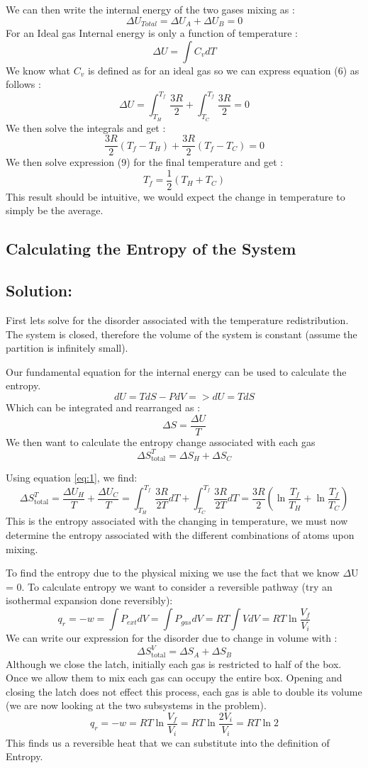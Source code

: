 \documentclass{article}
\newcommand{\be}{\begin{equation}}
\newcommand{\ee}{\end{equation}}
\begin{document}
We can then write the internal energy of the two gases mixing as : 
\be
\Delta U_{Total}=\Delta U_{A} + \Delta U_{B} = 0 
\ee
For an Ideal gas Internal energy is only a function of temperature : 
\be
\Delta U = \int C_v dT
\ee
We know what $C_v$ is defined as for an ideal gas so we can express equation (6) as follows : 
\be
\Delta U = \int ^{T_f}_{T_H} \frac{3R}{2} + \int ^{T_f}_{T_C} \frac{3R}{2} = 0  
\ee
We then solve the integrals and get : 
\be
\frac{3R}{2}({T_f}-{T_H})  + \frac{3R}{2}({T_f}-{T_C}) = 0 
\ee
We then solve expression (9) for the final temperature and get : 
\be
T_f = \frac{1}{2}(T_H + T_C )
\ee
This result should be intuitive, we would expect the change in temperature to simply be the average. 

\subsection{Calculating the Entropy of the System}

\subsection*{Solution:}
First lets solve for the disorder associated with the temperature redistribution. 
The system is closed, therefore the volume of the system is constant (assume the partition is infinitely small). 
 
Our fundamental equation for the internal energy can be used to calculate the entropy. 
\be
dU=TdS -PdV => dU=TdS 
\ee
Which can be integrated and rearranged as : 
\be \label{eq:1}
\Delta S= \frac{\Delta U}{T} 
\ee
We then want to calculate the entropy change associated with each gas 
\be
\Delta S_{\text{total}}^T = \Delta S_{H} + \Delta S_{C}
\ee

Using equation \ref{eq:1}, we find:
\be
\Delta S^T_{\text{total}} = \frac{\Delta U_H}{T} + \frac{\Delta U_C}{T} = \int^{T_f}_{T_H}{\frac{3R}{2T}}dT + \int^{T_f}_{T_C}{\frac{3R}{2T}}dT = \frac{3R}{2} (\ln\frac{T_f}{T_H} + \ln\frac{T_f}{T_C})
\ee 
This is the entropy associated with the changing in temperature, we must now determine the entropy associated with the different combinations of atoms upon mixing. 

To find the entropy due to the physical mixing we use the fact that we know $\Delta$U = 0.
To calculate entropy we want to consider a reversible pathway (try an isothermal expansion done reversibly): 
\be
q_r= -w = \int P_{ext}dV = \int P_{gas}dV = RT \int VdV = RT \ln\frac{V_f}{V_i}
\ee
We can write our expression for the disorder due to change in volume with : 
\be
\Delta S^V_{\text{total}} = \Delta S_A + \Delta S_B 
\ee
Although we close the latch, initially each gas is restricted to half of the box. 
Once we allow them to mix each gas can occupy the entire box. 
Opening and closing the latch does not effect this process, each gas is able to double its volume (we are now looking at the two subsystems in the problem). 
\be
q_r = -w = RT \ln\frac{V_f}{V_i} = RT \ln\frac{2V_i}{V_i} = RT \ln 2 
\ee
This finds us a reversible heat that we can substitute into the definition of Entropy. 
\end{document}
